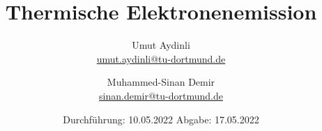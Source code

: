 

\subject{V504}
\title{Thermische Elektronenemission}
\author{Umut Aydinli \\
 \href{mailto:umut.aydinli@tu-dortmund.de}{umut.aydinli@tu-dortmund.de}
 \and Muhammed-Sinan Demir \\
 \href{mailto:sinan.demir@tu-dortmund.de}{sinan.demir@tu-dortmund.de}
 }
\date{
  Durchführung: 10.05.2022
  \hspace{3em}
  Abgabe: 17.05.2022
}




\maketitle
\tableofcontents
\newpage








\nocite{*}
\printbibliography{}

